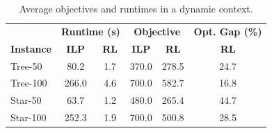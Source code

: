 \begin{table}[h]
    \centering
    \caption{Average objectives and runtimes in a dynamic context.}
    \label{tab:runtime_objective}
    \begin{tabular}{lcc|cc|c}
        \toprule
                          & \multicolumn{2}{c|}{\textbf{Runtime (s)}} & \multicolumn{2}{c|}{\textbf{Objective}} & \textbf{Opt. Gap (\%)}                             \\
        \textbf{Instance} & \textbf{ILP}                              & \textbf{RL}                             & \textbf{ILP}           & \textbf{RL} & \textbf{RL} \\
        \midrule
        Tree-50           & 80.2                                      & 1.7                                     & 370.0                  & 278.5       & 24.7        \\
        Tree-100          & 266.0                                     & 4.6                                     & 700.0                  & 582.7       & 16.8        \\
        Star-50           & 63.7                                      & 1.2                                     & 480.0                  & 265.4       & 44.7        \\
        Star-100          & 252.3                                     & 1.9                                     & 700.0                  & 500.8       & 28.5        \\
        \bottomrule
    \end{tabular}
    \label{tab:dynamic}
\end{table}